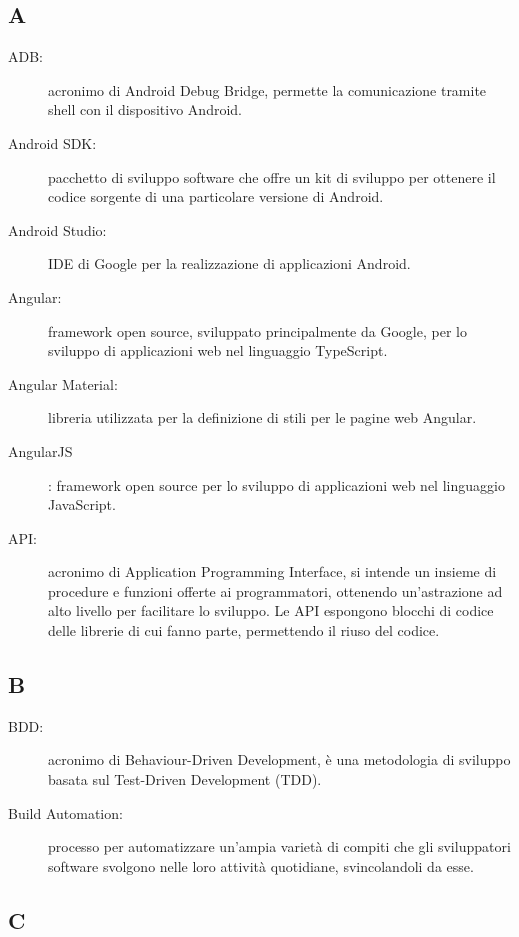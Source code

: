\documentclass[../manuale-manutentore.tex]{subfiles}
\begin{document}
\subsection{A}

\begin{description}
    \item[ADB:] acronimo di Android Debug Bridge, permette la comunicazione tramite shell con il dispositivo Android.
    \item[Android SDK:] pacchetto di sviluppo software che offre un kit di sviluppo per ottenere il codice sorgente di una particolare versione di Android.
    \item[Android Studio:] IDE di Google per la realizzazione di applicazioni Android.
    \item[Angular:] framework open source, sviluppato principalmente da Google, per lo sviluppo di applicazioni web nel linguaggio TypeScript.
    \item[Angular Material:] libreria utilizzata per la definizione di stili per le pagine web Angular.
    \item[AngularJS]: framework open source per lo sviluppo di applicazioni web nel linguaggio JavaScript.
    \item[API:] acronimo di Application Programming Interface, si intende un insieme di procedure e funzioni offerte ai programmatori, ottenendo un'astrazione ad alto livello per facilitare lo sviluppo. Le API espongono blocchi di codice delle librerie di cui fanno parte, permettendo il riuso del codice.
\end{description}

\subsection{B}
\begin{description}
    \item[BDD:] acronimo di Behaviour-Driven Development, è una metodologia di sviluppo basata sul Test-Driven Development (TDD).
    \item[Build Automation:] processo per automatizzare un'ampia varietà di compiti che gli sviluppatori software svolgono nelle loro attività quotidiane, svincolandoli da esse.
\end{description}

\subsection{C}
\end{document}
